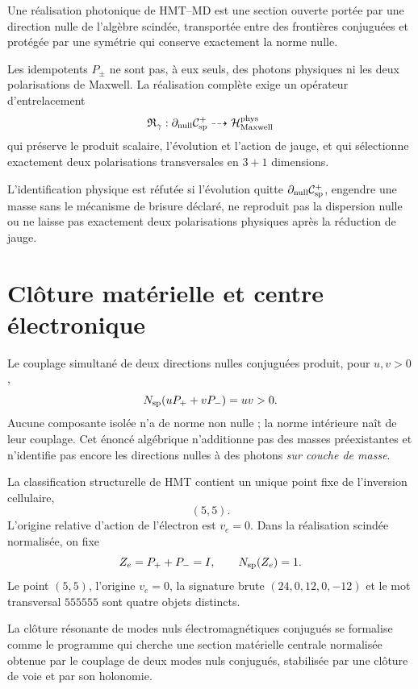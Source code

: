 \begin{definition}
\label{def:interfaz-fotonica-hmt-md}
Une réalisation photonique de HMT--MD est une section ouverte portée par
une direction nulle de l'algèbre scindée, transportée entre des frontières
conjuguées et protégée par une symétrie qui conserve exactement la norme
nulle.
\end{definition}

Les idempotents \(P_\pm\) ne sont pas, à eux seuls, des photons physiques ni les deux
polarisations de Maxwell. La réalisation complète exige un
opérateur d'entrelacement
\[
 \mathfrak R_\gamma:
 \partial_{\rm null}\mathcal C_{\rm sp}^{+}
 \dashrightarrow\mathcal H_{\rm Maxwell}^{\rm phys}
\]
qui préserve le produit scalaire, l'évolution et l'action de jauge, et qui
sélectionne exactement deux polarisations transversales en \(3+1\)
dimensions.

\begin{criterion}
\label{crit:sector-fotonico}
L'identification physique est réfutée si l'évolution quitte
\(\partial_{\rm null}\mathcal C_{\rm sp}^{+}\), engendre une masse sans le mécanisme
de brisure déclaré, ne reproduit pas la dispersion nulle ou ne laisse pas exactement
deux polarisations physiques après la réduction de jauge.
\end{criterion}

\section{Clôture matérielle et centre électronique}
\label{sec:clausura-material-electron}

Le couplage simultané de deux directions nulles conjuguées produit, pour
\(u,v>0\),
\[
 N_{\rm sp}(uP_++vP_-)=uv>0.
\]
Aucune composante isolée n'a de norme non nulle ; la norme intérieure
naît de leur couplage. Cet énoncé algébrique n'additionne pas des masses
préexistantes et n'identifie pas encore les directions nulles à des photons
\emph{sur couche de masse}.

   La classification structurelle de HMT contient un unique point fixe de l'inversion cellulaire,
\[
 (5,5).
\]
L'origine relative d'action de l'électron est \(v_e=0\). Dans la réalisation
scindée normalisée, on fixe
\[
 Z_e=P_++P_-=I,
 \qquad
 N_{\rm sp}(Z_e)=1.
\]
Le point \((5,5)\), l'origine \(v_e=0\), la signature brute
\((24,0,12,0,-12)\) et le mot transversal \(555555\) sont quatre objets
distincts.

\begin{definition}
\label{def:candidato-clausura-electronica}
La clôture résonante de modes nuls électromagnétiques conjugués se
formalise comme le programme qui cherche une section matérielle centrale normalisée
obtenue par le couplage de deux modes nuls conjugués, stabilisée par
une clôture de voie et par son holonomie.
\end{definition}

